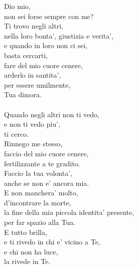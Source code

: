 \begin{haiku}
    Dio mio,\\
    non sei forse sempre con me?\\
    Ti trovo negli altri,\\
    nella loro bonta', giustizia e verita',\\
    e quando in loro non ci sei,\\
    basta cercarti,\\
    fare del mio cuore cenere,\\
    arderlo in santita',\\
    per essere umilmente,\\
    Tua dimora.\\
    \leavevmode\\
    Quando negli altri non ti vedo,\\
    e non ti vedo piu',\\
    ti cerco.\\
    Rinnego me stesso,\\
    faccio del mio cuore cenere,\\
    fertilizzante a te gradito.\\
    Faccio la tua volonta',\\
    anche se non e' ancora mia.\\
    E non manchera' molto,\\
    d'incontrare la morte,\\
    la fine della mia piccola identita' presente,\\
    per far spazio alla Tua.\\
    E tutto brilla,\\
    e ti rivedo in chi e' vicino a Te,\\
    e chi non ha luce,\\
    la rivede in Te.\\
\end{haiku}


